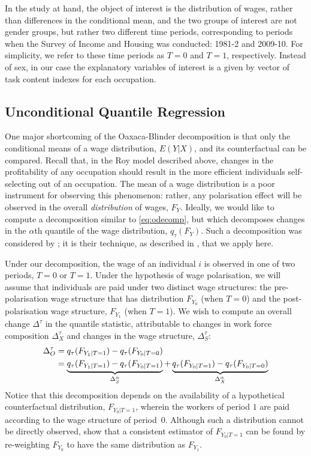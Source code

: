In the study at hand, the object of interest is the distribution of wages, rather than differences in the conditional mean, and the two groups of interest are not gender groups, but rather two different time periods, corresponding to periods when the Survey of Income and Housing was conducted: 1981-2 and 2009-10. For simplicity, we refer to these time periods as $T=0$ and $T=1$, respectively. Instead of sex, in our case the explanatory variables of interest is a given by vector of task content indexes for each occupation.  

\subsection{Unconditional Quantile Regression}

One major shortcoming of the Oaxaca-Blinder decomposition is that only the conditional means of a wage distribution, $E(Y|X)$, and its counterfactual can be compared. Recall that, in the Roy model described above, changes in the profitability of any occupation should result in the more efficient individuals self-selecting out of an occupation. The mean of a wage distribution is a poor instrument for observing this phenomenon: rather, any polarisation effect will be observed in the overall {\em distribution} of wages, $F_Y$. Ideally, we would like to compute a decomposition similar to \eqref{eq:odecomp}, but which decomposes changes in the $\alpha$th quantile of the wage distribution, $q_\tau(F_Y)$. Such a decomposition was considered by \citet{Firpo2011}; it is their technique, as described in \citet{Firpo2009}, that we apply here.

Under our decomposition, the wage of an individual $i$ is observed in one of two periods, $T=0$ or $T=1$. Under the hypothesis of wage polarisation, we will assume that individuals are paid under two distinct wage structures: the pre-polarisation wage structure that has distribution $F_{Y_0}$ (when $T=0$) and the post-polarisation wage structure, $F_{Y_1}$ (when $T=1$). We wish to compute an overall change $\Delta^\tau$ in the quantile statistic, attributable to changes in work force composition $\Delta^\tau_X$ and changes in the wage structure, $\Delta^\tau_S$:
\begin{align}
  \Delta^\tau_O &= q_\tau(F_{Y_1|T=1}) - q_\tau(F_{Y_0|T=0}) \notag \\
  &= \underbrace{q_\tau(F_{Y_1|T=1}) -  q_\tau(F_{Y_0|T=1})}_{\Delta^\alpha_S} + \underbrace{q_\tau(F_{Y_0|T=1}) - q_\tau(F_{Y_0|T=0})}_{\Delta^\alpha_X} \label{eq:decomp}
\end{align}Notice that this decomposition depends on the availability of a hypothetical counterfactual distribution, $F_{Y_0|T=1}$, wherein the workers of period $1$ are paid according to the wage structure of period~$0$. Although such a distribution cannot be directly observed, \citet{Firpo2011} show that a consistent estimator of $F_{Y_0|T=1}$ can be found by re-weighting $F_{Y_0}$ to have the same distribution as $F_{Y_1}$.

